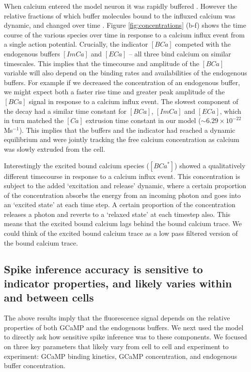 
When calcium entered the model neuron it was rapidly buffered  \parencite{bartol}. However the relative fractions of which buffer molecules bound to the influxed calcium was dynamic, and changed over time . Figure \ref{fig:concentrations} (b-f) shows the time course of the various species over time in response to a calcium influx event from a single action potential. Crucially, the indicator $[BCa]$ competed with the endogenous buffers $[ImCa]$ and $[ECa]$ – all three bind calcium on similar timescales. This implies that the timecourse and amplitude of the $[BCa]$ variable will also depend on the binding rates and availabilities of the endogenous buffers. For example if we decreased the concentration of an endogenous buffer, we might expect both a faster rise time and greater peak amplitude of the $[BCa]$ signal in response to a calcium influx event. The slowest component of the decay had a similar time constant for $[BCa]$, $[ImCa]$ and $[ECa]$, which in turn matched the $[Ca]$ extrusion time constant in our model ($\sim 6.29 \times 10^{-22}$Ms$^{-1}$). This implies that the buffers and the indicator had reached a dynamic equilibrium and were jointly tracking the free calcium concentration as calcium was slowly extruded from the cell.

Interestingly the excited bound calcium species ($[BCa^*]$) showed a qualitatively different timecourse in response to a calcium influx event. This concentration is subject to the added `excitation and release' dynamic, where a certain proportion of the concentration absorbs the energy from an incoming photon and goes into an `excited state' at each time step. A certain proportion of the concentration releases a photon and reverts to a `relaxed state' at each timestep also. This means that the excited bound calcium lags behind the bound calcium trace. We could think of the excited bound calcium trace as a low pass filtered version of the bound calcium trace.

\subsection{Spike inference accuracy is sensitive to indicator properties, and likely varies within and between cells}
The above results imply that the fluorescence signal depends on the relative properties of both GCaMP and the endogenous buffers. We next used the model to directly ask how sensitive spike inference was to these components. We focused on three key parameters that likely vary from cell to cell and experiment to experiment: GCaMP binding kinetics, GCaMP concentration, and endogenous buffer concentration.

